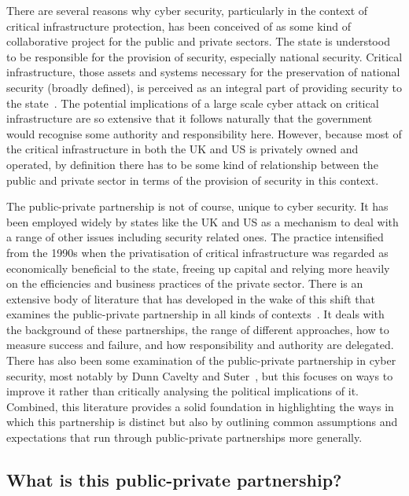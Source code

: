 \documentclass[a4paper,11pt]{article}
\begin{document}
There are several reasons why cyber security, particularly in the
context of critical infrastructure protection, has been conceived of
as some kind of collaborative project for the public and private
sectors. The state is understood to be responsible for the provision
of security, especially national security. Critical infrastructure,
those assets and systems necessary for the preservation of national
security (broadly defined), is perceived as an integral part of
providing security to the state~\cite{choucri-et-al:2014}. The
potential implications of a large scale cyber attack on critical
infrastructure are so extensive that it follows naturally that the
government would recognise some authority and responsibility
here. However, because most of the critical infrastructure in both the
UK and US is privately owned and operated, by definition there has to
be some kind of relationship between the public and private sector in
terms of the provision of security in this context.

The public-private partnership is not of course, unique to cyber
security. It has been employed widely by states like the UK and US as
a mechanism to deal with a range of other issues including security
related ones. The practice intensified from the 1990s when the
privatisation of critical infrastructure was regarded as economically
beneficial to the state, freeing up capital and relying more heavily
on the efficiencies and business practices of the private
sector. There is an extensive body of literature that has developed in
the wake of this shift that examines the public-private partnership in
all kinds of
contexts~\cite{osborne:2007,devries+yehoue:2013,mazzucato:2013}. It
deals with the background of these partnerships, the range of
different approaches, how to measure success and failure, and how
responsibility and authority are delegated. There has also been some
examination of the public-private partnership in cyber security, most
notably by Dunn Cavelty and Suter~\cite{dunncavelty+suter:2009}, but
this focuses on ways to improve it rather than critically analysing
the political implications of it. Combined, this literature provides a
solid foundation in highlighting the ways in which this partnership is
distinct but also by outlining common assumptions and expectations
that run through public-private partnerships more generally.

\subsection{What is this public-private partnership?}
\end{document}
